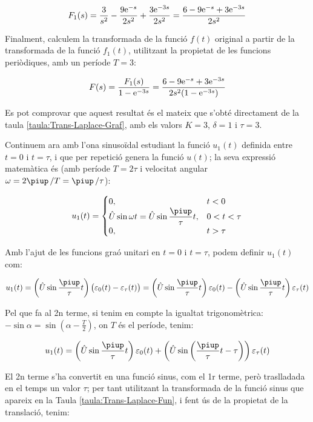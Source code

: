 \begin{exemple}
    \[
        F_1(s) = \frac{3}{s^2} - \frac{9 \mathrm{e}^{-s}}{2 s^2} + \frac{3 \mathrm{e}^{-3s}}{2
        s^2} =\frac{6-9\mathrm{e}^{-s}+3\mathrm{e}^{-3s}}{2s^2}
    \]

    Finalment, calculem la transformada de la funció $f(t)$ original a
    partir de la transformada de la funció $f_1(t)$, utilitzant la
    propietat de les funcions periòdiques, amb un període $T=3$:

    \[
        F(s) = \frac{F_1(s)}{1-\mathrm{e}^{-3s}} = \frac{6-9\mathrm{e}^{-s}+3\mathrm{e}^{-3s}}{2s^2(1-\mathrm{e}^{-3s}) }
    \]

    Es pot comprovar que aquest resultat és el mateix que s'obté directament de la taula \vref{taula:Trans-Laplace-Graf}, amb els valors $K=3$, $\delta=1$ i $\tau=3$.

    Continuem ara  amb l'ona sinusoïdal estudiant la funció $u_1(t)$
    definida entre $t=0$ i $t=\tau$, i que per repetició genera la
    funció $u(t)$; la seva expressió matemàtica és (amb període $T=
    2\tau$ i velocitat angular $\omega= 2\piup\,/T  = \piup\,/\tau$):

    \[
        u_1(t) = \begin{cases} 0, & t < 0\\ \hat{U}\sin\omega t =
        \hat{U}\sin\dfrac{\piup}{\tau}t,  & 0<t<\tau \\ 0, & t > \tau \end{cases}
    \]


    Amb l'ajut de les funcions graó unitari en $t=0$ i $t=\tau$, podem
    definir $u_1(t)$ com:

    \[
        u_1(t)=\left(\hat{U}\sin\frac{\piup}{\tau}t\right)\bigl(\varepsilon_0(t)-\varepsilon_\tau(t)\bigr)
        =\left(\hat{U}\sin\frac{\piup}{\tau}t\right)\varepsilon_0(t) - \left(\hat{U}\sin\frac{\piup}{\tau}t\right)\varepsilon_\tau(t)
    \]

    Pel que fa al 2n  terme, si tenim en compte la igualtat
    trigonomètrica: $-\sin \alpha = \sin(\alpha-\frac{T}{2})$, on $T$ és
    el període, tenim:

    \[
        u_1(t) = \left(\hat{U}\sin\frac{\piup}{\tau}t\right)\varepsilon_0(t) +
        \left(\hat{U}\sin\left(\frac{\piup}{\tau}t-\tau\right)\right)\varepsilon_\tau(t)
    \]

    El 2n terme s'ha convertit en una funció sinus, com el 1r terme,
    però traslladada en el temps un valor $\tau$; per tant utilitzant la
    transformada de la funció sinus que apareix en la Taula
    \vref{taula:Trans-Laplace-Fun}, i fent ús de la propietat de la
    translació, tenim:


\end{exemple}
